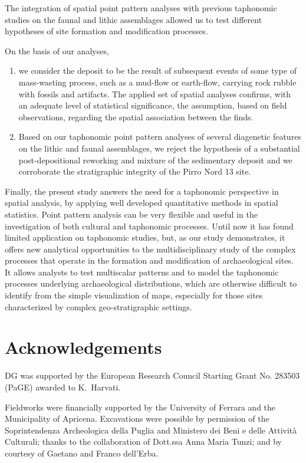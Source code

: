\documentclass[review,authoryear]{elsarticle} %
\begin{document}
The integration of spatial point pattern analyses with previous taphonomic studies on the faunal and lithic assemblages allowed us to test different hypotheses of site formation and modification processes.

On the basis of our analyses,
\begin{enumerate}
  \item we consider the deposit to be the result of subsequent events of some type of mass-wasting process, such as a mud-flow or earth-flow, carrying rock rubble with fossils and artifacts. The applied set of spatial analyses confirms, with an adequate level of statistical significance, the assumption, based on field observations, regarding the spatial association between the finds.
  \item Based on our taphonomic point pattern analyses of several diagenetic features on the lithic and faunal assemblages, we reject the hypothesis of a substantial post-depositional reworking and mixture of the sedimentary deposit and we corroborate the stratigraphic integrity of the Pirro Nord 13 site.
\end{enumerate}

Finally, the present study answers the need for a taphonomic perspective in spatial analysis, by applying well developed quantitative methods in spatial statistics. Point pattern analysis can be very flexible and useful in the investigation of both cultural and taphonomic processes. Until now it has found limited application on taphonomic studies, but, as our study demonstrates, it offers new analytical opportunities to the multidisciplinary study of the complex processes that operate in the formation and modification of archaeological sites. It allows analysts to test multiscalar patterns and to model the taphonomic processes underlying archaeological distributions, which are otherwise difficult to identify from the simple visualization of maps, especially for those sites characterized by complex geo-stratigraphic settings.

\section*{Acknowledgements}

DG was supported by the European Research Council Starting Grant No. 283503 (PaGE) awarded to K.~Harvati.

Fieldworks were financially supported by the University of Ferrara and the Municipality of Apricena. Excavations were possible by permission of the Soprintendenza Archeologica della Puglia and Ministero dei Beni e delle Attività Culturali; thanks to the collaboration of Dott.ssa Anna Maria Tunzi; and by courtesy of Gaetano and Franco dell'Erba.
\end{document}
